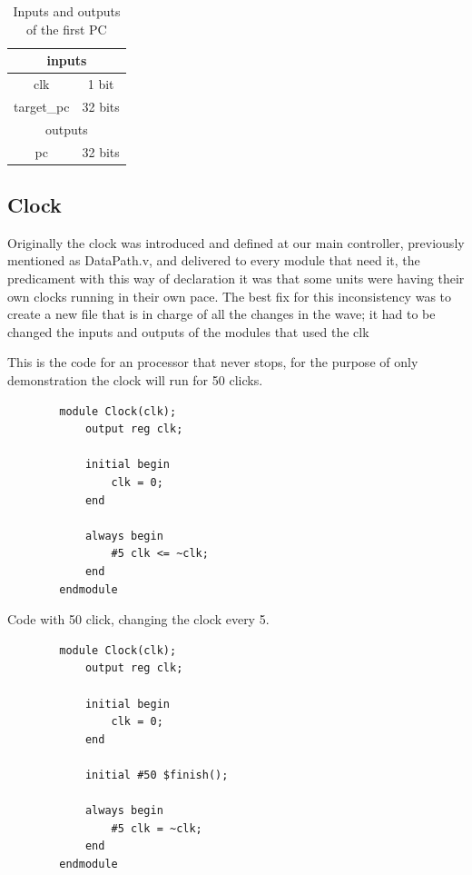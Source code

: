 \documentclass[conference]{IEEEtran}
\begin{document}
        
        \begin{table}[htbp]
        \caption{Inputs and outputs of the first PC}
        \begin{center}
        \begin{tabular}{|c|c|}
        \hline
        \multicolumn{2}{|c|}{inputs} \\ \hline
        clk & 1 bit \\ \hline
        target\_pc & \multicolumn{1}{l|}{32 bits} \\ \hline
        \multicolumn{2}{|c|}{outputs} \\ \hline
        pc & 32 bits \\ \hline
        \end{tabular}
        \label{tab5}
        \end{center}
        \end{table}
        
        
        
    \subsection{Clock}
    Originally the clock was introduced and defined at our main controller, previously mentioned as DataPath.v, and delivered to every module that need it, the predicament with this way of declaration it was that some units were having their own clocks running in their own pace. The best fix for this inconsistency was to create a new file that is in charge of all the changes in the wave; it had to be changed the inputs and outputs of the modules that used the clk 
    
    
    This is the code for an processor that never stops, for the purpose of only demonstration the clock will run for 50 clicks. 
        \begin{lstlisting}
        module Clock(clk);
            output reg clk;
            
            initial begin
            	clk = 0;
            end
           
            always begin
            	#5 clk <= ~clk;
            end
        endmodule
        \end{lstlisting}
        
        \bigbreak
        Code with 50 click, changing the clock every 5.
        \begin{lstlisting}
        module Clock(clk);
            output reg clk;
            
            initial begin
            	clk = 0;
            end
            
            initial #50 $finish();
            
            always begin
            	#5 clk = ~clk;
            end
        endmodule
        \end{lstlisting}
        
\end{document}
